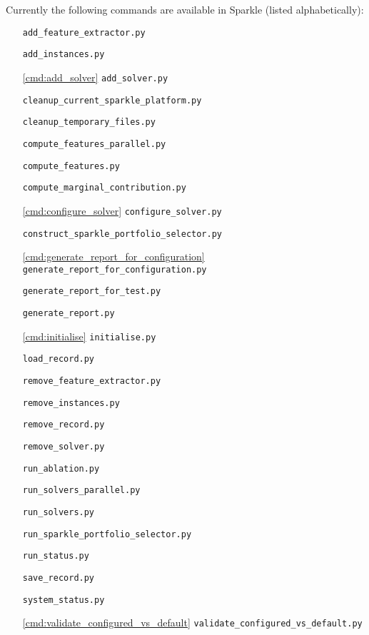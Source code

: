 \documentclass{article}
\begin{document}
Currently the following commands are available in Sparkle (listed alphabetically):

\begin{itemize}[noitemsep]
  \item[] \texttt{add\_feature\_extractor.py}
  \item[] \texttt{add\_instances.py}
  \item[\ref{cmd:add_solver}] \texttt{add\_solver.py}
  \item[] \texttt{cleanup\_current\_sparkle\_platform.py}
  \item[] \texttt{cleanup\_temporary\_files.py}
  \item[] \texttt{compute\_features\_parallel.py}
  \item[] \texttt{compute\_features.py}
  \item[] \texttt{compute\_marginal\_contribution.py}
  \item[\ref{cmd:configure_solver}] \texttt{configure\_solver.py}
  \item[] \texttt{construct\_sparkle\_portfolio\_selector.py}
  \item[\ref{cmd:generate_report_for_configuration}] \texttt{generate\_report\_for\_configuration.py}
  \item[] \texttt{generate\_report\_for\_test.py}
  \item[] \texttt{generate\_report.py}
  \item[\ref{cmd:initialise}] \texttt{initialise.py}
  \item[] \texttt{load\_record.py}
  \item[] \texttt{remove\_feature\_extractor.py}
  \item[] \texttt{remove\_instances.py}
  \item[] \texttt{remove\_record.py}
  \item[] \texttt{remove\_solver.py}
  \item[] \texttt{run\_ablation.py}
  \item[] \texttt{run\_solvers\_parallel.py}
  \item[] \texttt{run\_solvers.py}
  \item[] \texttt{run\_sparkle\_portfolio\_selector.py}
  \item[] \texttt{run\_status.py}
  \item[] \texttt{save\_record.py}
  \item[] \texttt{system\_status.py}
  \item[\ref{cmd:validate_configured_vs_default}] \texttt{validate\_configured\_vs\_default.py}
\end{itemize}
\end{document}
